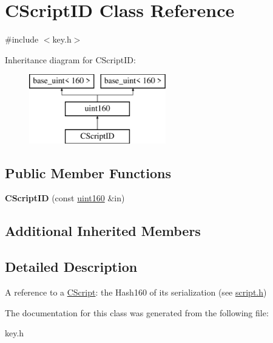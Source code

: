 \hypertarget{class_c_script_i_d}{}\section{C\+Script\+ID Class Reference}
\label{class_c_script_i_d}


{\ttfamily \#include $<$key.\+h$>$}

Inheritance diagram for C\+Script\+ID\+:\begin{figure}[H]
\begin{center}
\leavevmode
\includegraphics[height=3.000000cm]{class_c_script_i_d}
\end{center}
\end{figure}
\subsection*{Public Member Functions}
\begin{DoxyCompactItemize}
\item 
\mbox{\label{class_c_script_i_d_a69619562a6a5fdf4ccfd20fee9418cc5}} 
{\bfseries C\+Script\+ID} (const \mbox{\hyperlink{classuint160}{uint160}} \&in)
\end{DoxyCompactItemize}
\subsection*{Additional Inherited Members}


\subsection{Detailed Description}
A reference to a \mbox{\hyperlink{class_c_script}{C\+Script}}\+: the Hash160 of its serialization (see \mbox{\hyperlink{script_8h_source}{script.\+h}}) 

The documentation for this class was generated from the following file\+:\begin{DoxyCompactItemize}
\item 
key.\+h\end{DoxyCompactItemize}

